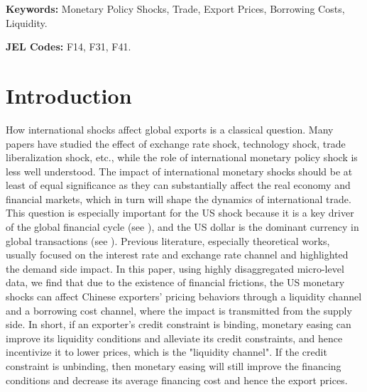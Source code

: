 \textbf{Keywords:} Monetary Policy Shocks, Trade, Export Prices, Borrowing Costs, Liquidity. 

\textbf{JEL Codes:} F14, F31, F41.
\newpage


\newpage
\section{Introduction}

How international shocks affect global exports is a classical question.  Many papers have studied the effect of exchange rate shock, technology shock, trade liberalization shock, etc., while the role of international monetary policy shock is less well understood. The impact of international monetary shocks should be at least of equal significance as they can substantially affect the real economy and financial markets, which in turn will shape the dynamics of international trade. This question is especially important for the US shock because it is a key driver of the global financial cycle (see \cite{miranda2020us}), and the US dollar is the dominant currency in global transactions (see {\cite{gopinath2020dominant}}). Previous literature, especially theoretical works, usually focused on the interest rate and exchange rate channel and highlighted the demand side impact. In this paper, using highly disaggregated micro-level data, we find that due to the existence of financial frictions, the US monetary shocks can affect Chinese exporters' pricing behaviors through a liquidity channel and a borrowing cost channel, where the impact is transmitted from the supply side. In short, if an exporter’s credit constraint is binding, monetary easing can improve its liquidity conditions and alleviate its credit constraints, and hence incentivize it to lower prices, which is the "liquidity channel". If the credit constraint is unbinding, then monetary easing will still improve the financing conditions and decrease its average financing cost and hence the export prices.

